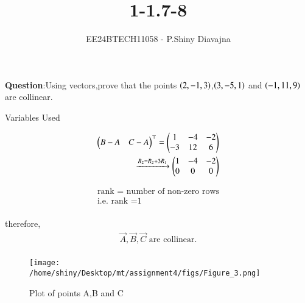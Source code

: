 \documentclass[journal]{IEEEtran}
\begin{document}

\vspace{3cm}

\title{1-1.7-8}
\author{EE24BTECH11058 - P.Shiny Diavajna}
{\let\newpage\relax\maketitle}

\renewcommand{\thefigure}{\theenumi}
\renewcommand{\thetable}{\theenumi}
\setlength{\intextsep}{10pt} %


\renewcommand{\thetable}{\theenumi}


\textbf{Question}:Using vectors,prove that the points $\left(2,-1,3\right)$,$\left(3,-5,1\right)$ and $\left(-1,11,9\right)$ are collinear. \\

\solution 
\begin{table}[h!]    
  \centering
  
  \caption{Variables Used}
  \label{tab1-1.7-8.1}
\end{table}

  \begin{align*}
	\begin{pmatrix}B-A & C-A\end{pmatrix}^\top =\begin{pmatrix}1 & -4 & -2 \\-3 & 12 &6\end{pmatrix}\\
	\xrightarrow{R_2=R_2+3R_1} \begin{pmatrix}1 & -4 &-2\\ 0 & 0 &0\end{pmatrix}\\ 
  \end{align*} 

  \begin{align*}
	\text{rank = number of non-zero rows}\\
	\text{i.e. rank =1}\\
  \end{align*}
	

therefore,\\ 
\begin{align*}	
	\vec{A}, \vec{B} , \vec{C} \text{ are collinear.}\\
\end{align*}



  \begin{figure}[h!]
   \centering
   \texttt{[image: /home/shiny/Desktop/mt/assignment4/figs/Figure\_3.png]}
   \caption{Plot of points A,B and C}
  \end{figure}
\end{document}
